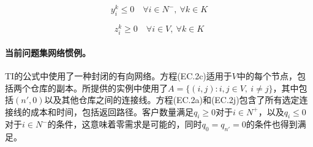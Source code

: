 \documentclass{article}
\begin{document}
\begin{equation}
y_i^k \le 0
\quad \forall i \in N^{-},\ \forall k \in K
\tag{EC.2o}
\end{equation}

\begin{equation}
z_i^k \ge 0
\quad \forall i \in V,\ \forall k \in K
\tag{EC.2p}
\end{equation}

\paragraph{当前问题集网络惯例。}
TI的公式中使用了一种封闭的有向网络。方程(EC.2c)适用于$V$中的每个节点，包括两个仓库的副本。所提供的实例中使用了$A=\{(i,j):i,j\in V,\ i\ne j\}$，其中包括$(n',0)$以及其他仓库之间的连接线。方程(EC.2a)和(EC.2j)包含了所有选定连接线的成本和时间，包括返回路径。客户数量满足$q_i\ge0$对于$i\in N^+$，以及$q_i\le0$对于$i\in N^-$的条件，这意味着零需求是可能的，同时$q_0=q_{n'}=0$的条件也得到满足。 
\end{document}
